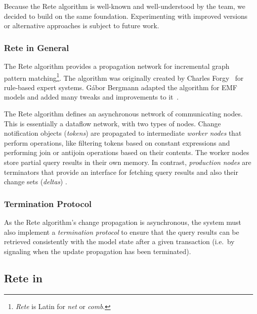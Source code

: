 Because the Rete algorithm is well-known and well-understood by the \eiq{} team, we decided to build \iqd{} on the same foundation. Experimenting with improved versions or alternative approaches is subject to future work.

\subsubsection{Rete in General}

The Rete algorithm provides a propagation network for incremental graph pattern matching\footnote{\emph{Rete} is Latin for \emph{net} or \emph{comb}.}. The algorithm was originally created by Charles Forgy~\cite{Forgy} for rule-based expert systems. Gábor Bergmann adapted the algorithm for EMF models and added many tweaks and improvements to it~\cite{BergmannRete}.


The Rete algorithm defines an asynchronous network of communicating nodes. This is essentially a dataflow network, with two types of nodes. Change notification objects (\emph{tokens}) are propagated to intermediate \emph{worker nodes} that perform operations, like filtering tokens based on constant expressions and performing join or antijoin operations based on their contents. The worker nodes store partial query results in their own memory. In contrast, \emph{production nodes} are terminators that provide an interface for fetching query results and also their change sets (\emph{deltas}) . %


\subsubsection{Termination Protocol}

As the Rete algorithm's change propagation is asynchronous, the system must also implement a \emph{termination protocol} to ensure that the query results can be retrieved consistently with the model state after a given transaction (i.e.\ by signaling when the update propagation has been terminated).


\subsection{Rete in \eiq{}}

